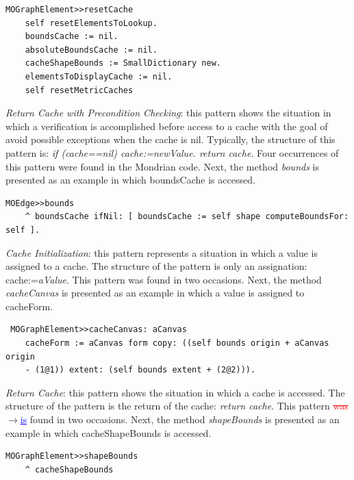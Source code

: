 \documentclass[runningheads]{llncs}
\newcommand{\ra}{$\rightarrow$}
\newcommand{\chg}[2]{\textcolor{red}{\sout{#1}}{\ra}\textcolor{blue}{\uline{#2}}} %
\begin{document}
\begin{lstlisting} 
MOGraphElement>>resetCache 
	self resetElementsToLookup.
	boundsCache := nil. 
	absoluteBoundsCache := nil. 
	cacheShapeBounds := SmallDictionary new. 
	elementsToDisplayCache := nil. 
	self resetMetricCaches
\end{lstlisting}

\emph{Return Cache with Precondition Checking}: this pattern shows
the situation in which a verification is accomplished before access
to a cache with the goal of avoid possible exceptions when the cache
is nil. Typically, the structure of this pattern is: \emph{if (cache==nil)
cache:=newValue. return cache}. Four occurrences of this pattern were
found in the Mondrian code. Next, the method \emph{bounds} is presented
as an example in which boundsCache is accessed.

\begin{lstlisting}
MOEdge>>bounds
	^ boundsCache ifNil: [ boundsCache := self shape computeBoundsFor: self ].
\end{lstlisting}

\emph{Cache Initialization}: this pattern represents a situation in
which a value is assigned to a cache. The structure of the pattern
is only an assignation: cache:=\emph{aValue}. This pattern was found
in two occasions. Next, the method \emph{cacheCanvas} is presented
as an example in which a value is assigned to cacheForm.

\begin{lstlisting}
 MOGraphElement>>cacheCanvas: aCanvas 
	cacheForm := aCanvas form copy: ((self bounds origin + aCanvas origin 
	- (1@1)) extent: (self bounds extent + (2@2))). 
\end{lstlisting}

\emph{Return Cache}: this pattern shows the situation in which a cache
is accessed. The structure of the pattern is the return of the cache:
\emph{return cache}. This pattern \chg{was}{is} found in two occasions. Next,
the method \emph{shapeBounds} is presented as an example in which
cacheShapeBounds is accessed.

\begin{lstlisting} 
MOGraphElement>>shapeBounds 
	^ cacheShapeBounds 
\end{lstlisting}
\end{document}
